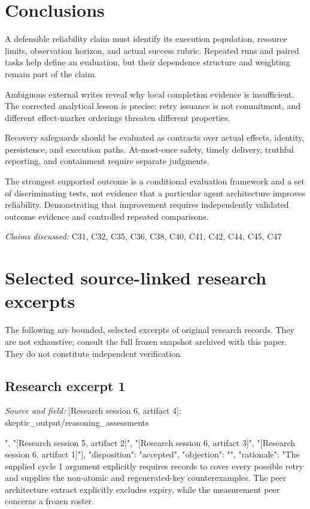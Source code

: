\documentclass[11pt]{article}
\begin{document}
\section{Conclusions}
A defensible reliability claim must identify its execution population, resource limits, observation horizon, and actual success rubric. Repeated runs and paired tasks help define an evaluation, but their dependence structure and weighting remain part of the claim.

Ambiguous external writes reveal why local completion evidence is insufficient. The corrected analytical lesson is precise: retry issuance is not commitment, and different effect-marker orderings threaten different properties.

Recovery safeguards should be evaluated as contracts over actual effects, identity, persistence, and execution paths. At-most-once safety, timely delivery, truthful reporting, and containment require separate judgments.

The strongest supported outcome is a conditional evaluation framework and a set of discriminating tests, not evidence that a particular agent architecture improves reliability. Demonstrating that improvement requires independently validated outcome evidence and controlled repeated comparisons.

\textit{Claims discussed: }C31, C32, C35, C36, C38, C40, C41, C42, C44, C45, C47
\appendix
\section{Selected source-linked research excerpts}
The following are bounded, selected excerpts of original research records. They are not exhaustive; consult the full frozen snapshot archived with this paper. They do not constitute independent verification.
\subsection{Research excerpt 1}
\textit{Source and field: }[Research session 6, artifact 4]: skeptic\_output/reasoning\_assessments\par
[\{"basis\_artifact\_ids": ["[Research session 6, artifact 2]", "[Research session 5, artifact 2]", "[Research session 6, artifact 3]", "[Research session 6, artifact 1]"], "disposition": "accepted", "objection": "", "rationale": "The supplied cycle 1 argument explicitly requires records to cover every possible retry and supplies the non-atomic and regenerated-key counterexamples. The peer architecture extract explicitly excludes expiry, while the measurement peer concerns a frozen roster.
\end{document}
